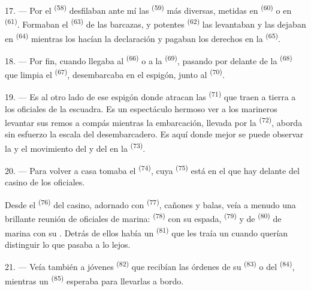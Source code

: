 17. --- Por el  \textsuperscript{(58)} desfilaban ante mí las
 \textsuperscript{(59)} más diversas, metidas en 
\textsuperscript{(60)} o en  \textsuperscript{(61)}. Formaban el
 \textsuperscript{(63)} de las barcazas, y potentes 
\textsuperscript{(62)} las levantaban y las dejaban en 
\textsuperscript{(64)} mientras los  hacían la declaración y
pagaban los derechos en la  \textsuperscript{(65)}.

18. --- Por fin, cuando llegaba al  \textsuperscript{(66)} o
a la  \textsuperscript{(69)}, pasando por delante de la 
\textsuperscript{(68)} que limpia el  \textsuperscript{(67)}, desembarcaba en
el espigón, junto al  \textsuperscript{(70)}.

19. --- Es al otro lado de ese espigón donde atracan las 
\textsuperscript{(71)} que traen a tierra a los oficiales de la escuadra. Es un
espectáculo hermoso ver a los marineros levantar sus remos a compás
mientras la embarcación, llevada por la  \textsuperscript{(72)}, aborda
sin esfuerzo la escala del desembarcadero. Es aquí donde mejor se puede
observar la  y el movimiento del  y del
 en la  \textsuperscript{(73)}.

\VUsaut{3.0mm}
\VUsaut{3.0mm}

20. --- Para volver a casa tomaba el 
\textsuperscript{(74)}, cuya  \textsuperscript{(75)} está en el 
que hay delante del casino de los oficiales.

Desde el  \textsuperscript{(76)} del casino, adornado con
 \textsuperscript{(77)}, cañones y balas, veía a menudo una brillante
reunión de oficiales de marina:  \textsuperscript{(78)}
con su espada,  \textsuperscript{(79)} y de
 \textsuperscript{(80)} de marina con su . Detrás de
ellos había un  \textsuperscript{(81)} que les traía un
 cuando querían distinguir lo que pasaba a lo lejos.

21. --- Veía también a jóvenes  \textsuperscript{(82)} que
recibían las órdenes de su  \textsuperscript{(83)} o del
 \textsuperscript{(84)}, mientras un  \textsuperscript{(85)}
esperaba para llevarlas a bordo.


